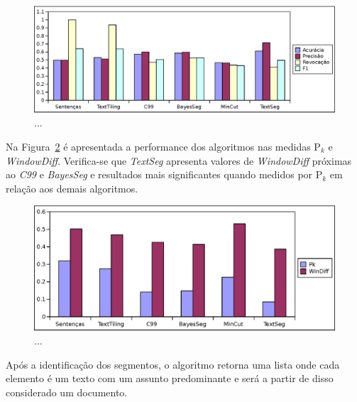 
  \begin{figure}[!h]
	  \centering
	  \includegraphics[width=1\textwidth]{conteudo/capitulos/figs/grafico-medidas-APRF1.eps}
	  \caption{...}
	  \label{fig:grafico-medidas-tradicionais}
  \end{figure}
  

Na Figura~\ref{fig:grafico-medidas-Pk-Wd} é apresentada a performance dos algoritmos nas medidas P$_k$ e \textit{WindowDiff}. Verifica-se que \textit{TextSeg} apresenta valores de \textit{WindowDiff} próximas ao \textit{C99} e \textit{BayesSeg} e resultados mais significantes quando medidos por P$_k$ em relação aos demais algoritmos.



  \begin{figure}[!h]
	  \centering
	  \includegraphics[width=1\textwidth]{conteudo/capitulos/figs/grafico-medidas-Pk-Wd.eps}
	  \caption{...}
	  \label{fig:grafico-medidas-Pk-Wd}
  \end{figure}












Após a identificação dos segmentos, o algoritmo retorna uma lista onde cada elemento é um texto com um assunto predominante e será a partir de disso considerado um documento.

